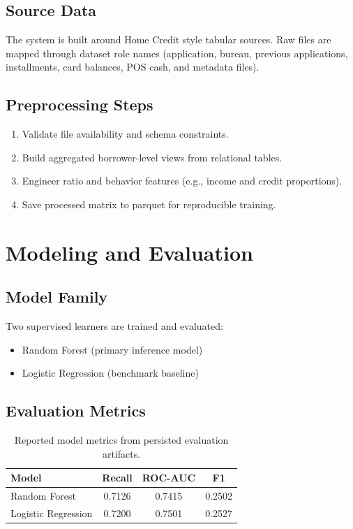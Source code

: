 \documentclass[12pt,a4paper]{article}
\begin{document}
\subsection{Source Data}
The system is built around Home Credit style tabular sources. Raw files are mapped through dataset role names (application, bureau, previous applications, installments, card balances, POS cash, and metadata files).

\subsection{Preprocessing Steps}
\begin{enumerate}[leftmargin=1.7em]
  \item Validate file availability and schema constraints.
  \item Build aggregated borrower-level views from relational tables.
  \item Engineer ratio and behavior features (e.g., income and credit proportions).
  \item Save processed matrix to parquet for reproducible training.
\end{enumerate}

\section{Modeling and Evaluation}
\subsection{Model Family}
Two supervised learners are trained and evaluated:
\begin{itemize}[leftmargin=1.5em]
  \item Random Forest (primary inference model)
  \item Logistic Regression (benchmark baseline)
\end{itemize}

\subsection{Evaluation Metrics}
\begin{table}[h]
\centering
\begin{tabular}{lccc}
\toprule
Model & Recall & ROC-AUC & F1 \\
\midrule
Random Forest & 0.7126 & 0.7415 & 0.2502 \\
Logistic Regression & 0.7200 & 0.7501 & 0.2527 \\
\bottomrule
\end{tabular}
\caption{Reported model metrics from persisted evaluation artifacts.}
\end{table}
\end{document}

